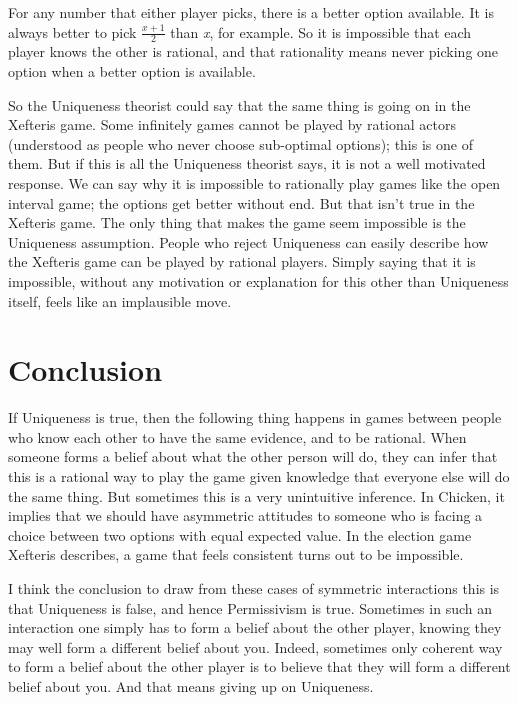 \documentclass[
  12pt,
  letterpaper,
  DIV=11,
  numbers=noendperiod]{scrreprt}
\begin{document}
For any number that either player picks, there is a better option
available. It is always better to pick \(\frac{x+1}{2}\) than \emph{x},
for example. So it is impossible that each player knows the other is
rational, and that rationality means never picking one option when a
better option is available.

So the Uniqueness theorist could say that the same thing is going on in
the Xefteris game. Some infinitely games cannot be played by rational
actors (understood as people who never choose sub-optimal options); this
is one of them. But if this is all the Uniqueness theorist says, it is
not a well motivated response. We can say why it is impossible to
rationally play games like the open interval game; the options get
better without end. But that isn't true in the Xefteris game. The only
thing that makes the game seem impossible is the Uniqueness assumption.
People who reject Uniqueness can easily describe how the Xefteris game
can be played by rational players. Simply saying that it is impossible,
without any motivation or explanation for this other than Uniqueness
itself, feels like an implausible move.

\section{Conclusion}\label{conclusion}

If Uniqueness is true, then the following thing happens in games between
people who know each other to have the same evidence, and to be
rational. When someone forms a belief about what the other person will
do, they can infer that this is a rational way to play the game given
knowledge that everyone else will do the same thing. But sometimes this
is a very unintuitive inference. In Chicken, it implies that we should
have asymmetric attitudes to someone who is facing a choice between two
options with equal expected value. In the election game Xefteris
describes, a game that feels consistent turns out to be impossible.

I think the conclusion to draw from these cases of symmetric
interactions this is that Uniqueness is false, and hence Permissivism is
true. Sometimes in such an interaction one simply has to form a belief
about the other player, knowing they may well form a different belief
about you. Indeed, sometimes only coherent way to form a belief about
the other player is to believe that they will form a different belief
about you. And that means giving up on Uniqueness.
\end{document}
